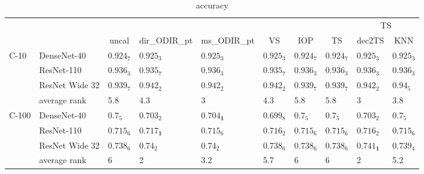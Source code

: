 \begin{table*}
\caption{accuracy}
\label{table:accuracy}
\centering
\begin{adjustbox}{width=\textwidth}

\begin{tabular}{llllllllll}
\toprule
\multicolumn{8}{c}{}&\multicolumn{2}{c}{TS}\\
\cmidrule{9-10}
\multicolumn{1}{c}{}&\multicolumn{1}{c}{}&\multicolumn{1}{c}{uncal}&\multicolumn{1}{c}{dir_ODIR_pt}&\multicolumn{1}{c}{ms_ODIR_pt}&\multicolumn{1}{c}{VS}&\multicolumn{1}{c}{IOP}&\multicolumn{1}{c}{TS}&\multicolumn{1}{c}{dec2TS}&\multicolumn{1}{c}{KNN}\\\midrule
C-10 & DenseNet-40 &  $0.924_{7}$ &           $0.925_{3}$ &           $0.925_{3}$ &  $0.925_{3}$ &  $0.924_{7}$ &  $0.924_{7}$ &           $0.925_{3}$ &  $0.925_{3}$ \\
      & ResNet-110 &  $0.936_{3}$ &           $0.935_{7}$ &           $0.936_{3}$ &  $0.935_{7}$ &  $0.936_{3}$ &  $0.936_{3}$ &           $0.936_{3}$ &  $0.936_{3}$ \\
      & ResNet Wide 32 &  $0.939_{7}$ &           $0.942_{2}$ &           $0.942_{2}$ &  $0.942_{2}$ &  $0.939_{7}$ &  $0.939_{7}$ &           $0.942_{2}$ &   $0.94_{5}$ \\
\cmidrule{2-10}
      & average rank &          5.8 &                   4.3 &                     3 &          4.3 &          5.8 &          5.8 &                     3 &          3.8 \\
\cmidrule{1-10}
C-100 & DenseNet-40 &    $0.7_{5}$ &           $0.703_{2}$ &  $\mathbf{0.704_{1}}$ &  $0.699_{8}$ &    $0.7_{5}$ &    $0.7_{5}$ &           $0.703_{2}$ &    $0.7_{5}$ \\
      & ResNet-110 &  $0.715_{6}$ &  $\mathbf{0.717_{1}}$ &           $0.715_{6}$ &  $0.716_{2}$ &  $0.715_{6}$ &  $0.715_{6}$ &           $0.716_{2}$ &  $0.715_{6}$ \\
      & ResNet Wide 32 &  $0.738_{6}$ &            $0.74_{2}$ &            $0.74_{2}$ &  $0.738_{6}$ &  $0.738_{6}$ &  $0.738_{6}$ &  $\mathbf{0.741_{1}}$ &  $0.739_{4}$ \\
\cmidrule{2-10}
      & average rank &            6 &                     2 &                   3.2 &          5.7 &            6 &            6 &                     2 &          5.2 \\
\bottomrule
\end{tabular}


\end{adjustbox}
\end{table*}